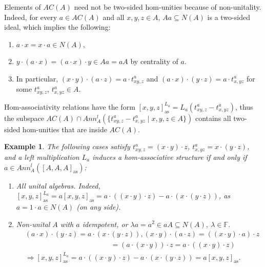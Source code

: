 \documentclass[12pt]{article}
\newtheorem{example}[theorem]{Example}
\begin{document}
		
		Elements of $AC(A)$ need not be two-sided hom-unities because of non-unitality. Indeed, for every $a\in AC(A)$ and all $x,y,z\in A$, $Aa\subseteq N(A)$ is a two-sided ideal, which implies the following:
		\begin{enumerate}[label=\textnormal{\arabic*)}]
			\item $a\cdot x=x\cdot a\in N(A)$,
			\item $y\cdot (a\cdot x)=(a\cdot x)\cdot y\in Aa=a A$ by centrality of $a$.
			\item In particular, $(x\cdot y)\cdot (a\cdot z)=a\cdot t^a_{xy,z}$ and $(a\cdot x)\cdot (y\cdot z)=a\cdot t^a_{x,yz}$ for some $t^a_{xy,z}$, $t^a_{x,yz}\in A$.
		\end{enumerate}
		Hom-associativity relations have the form $[x,y,z]_{\mathrm{as}}^{L_a}=L_a(t^a_{xy,z}-t^a_{x,yz})$, thus the subspace $AC(A)\cap Ann_A^l(\{t^a_{xy,z}-t^a_{x,yz}\mid x,y,z\in A\})$ contains all two-sided hom-unities that are inside $AC(A)$.
		\begin{example}
			The following cases satisfy $t^a_{xy,z}=(x\cdot y)\cdot z$, $t^a_{x,yz}=x\cdot (y\cdot z)$, and a left multiplication $L_a$ induces a hom-associative structure if and only if $a\in Ann_A^l([A,A,A]_{\mathrm{as}})$:
			\begin{enumerate}[label=\textnormal{\arabic*)}]
				\item All unital algebras. Indeed, $[x,y,z]_{\mathrm{as}}^{L_a}=a[x,y,z]_{\mathrm{as}}=a\cdot ((x\cdot y)\cdot z)-a\cdot (x\cdot (y\cdot z))$, as $a=1\cdot a\in N(A)$ (on any side).
				\item Non-unital $A$ with $a$ idempotent, or $\lambda a=a^2\in a A\subseteq N(A),\ \lambda\in\mathbb{F}$.
				\begin{align*}
					& (a\cdot x)\cdot (y\cdot z)=a\cdot (x\cdot (y\cdot z)), (x\cdot y)\cdot (a\cdot z)=((x\cdot y)\cdot a)\cdot z\\
					& \hspace{5cm} =(a\cdot (x\cdot y))\cdot z=a\cdot ((x\cdot y)\cdot z)\\
					& \Rightarrow [x,y,z]_{\mathrm{as}}^{L_a}=a\cdot ((x\cdot y)\cdot z)-a\cdot (x\cdot (y\cdot z))=a[x,y,z]_{\mathrm{as}}.
				\end{align*}
			\end{enumerate}
		\end{example}
		
\end{document}
